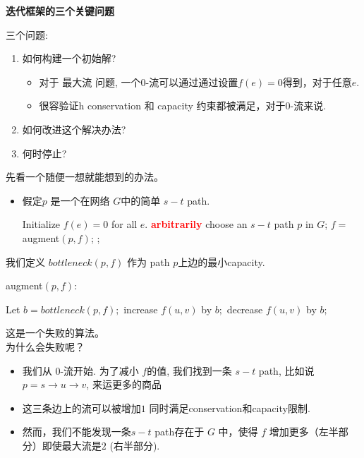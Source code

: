 \documentclass[11pt]{article}
\begin{document}
\begin{CJK}{UTF8}{gbsn}
\textbf{迭代框架的三个关键问题}


三个问题:
\begin{enumerate}
\item 如何构建一个初始解?
	\begin{itemize}
	\item 对于 {\sc 最大流} 问题,  一个0-流可以通过通过设置$f(e)=0$得到，对于任意$e$.
	\item 很容验证h {\sc conservation} 和 {\sc capacity} 约束都被满足，对于0-流来说.
	\end{itemize}
\item 如何改进这个解决办法?
\item 何时停止?
\end{enumerate}

先看一个随便一想就能想到的办法。

 \begin{itemize}
 \item
假定$p$ 是一个在网络 $G$中的简单 ${s-t}$ path.

  \begin{algorithmic}[1]
    \STATE Initialize $f(e)=0$ for all $e$.
    \STATE  \textcolor{red}{\bf arbitrarily} choose an $s-t$ path $p$ in $G$;
    \STATE $f = ${\sc augment}$(p, f)$;
    \ENDWHILE
    ;
  \end{algorithmic}
\end{itemize}

我们定义 $bottleneck(p, f)$ 作为 path $p$上边的最小capacity.

{\sc augment}$(p, f):$\\
  \begin{algorithmic}[1]
  \STATE Let $b=bottleneck(p, f);$
    \STATE increase $f(u,v)$ by $b;$
    \ELSE
    \STATE decrease $f(u,v)$ by $b;$
    \ENDIF
    \ENDFOR
  \end{algorithmic}

这是一个失败的算法。\\

为什么会失败呢？

\begin{itemize}
 \item
我们从 0-流开始.
为了减小 $f$的值, 我们找到一条 $s-t$ path, 比如说 $p = s\rightarrow u  \rightarrow v$, 来运更多的商品
\item
这三条边上的流可以被增加$1$ 同时满足conservation和capacity限制.
\item
然而，我们不能发现一条$s-t$ path存在于 $G$ 中，使得 $f$ 增加更多（左半部分）即使最大流是$2$ (右半部分).


\end{itemize}
\end{CJK}
\end{document}
